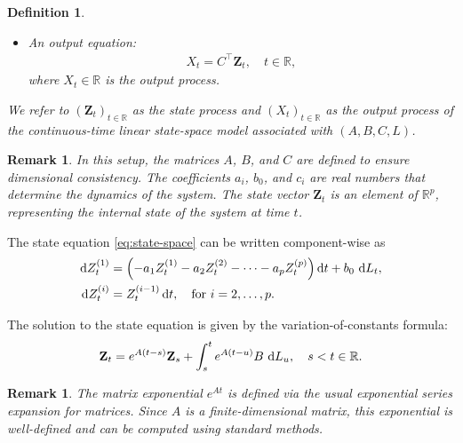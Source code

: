 \documentclass[10pt,a4paper,reqno]{amsart}
\newtheorem{definition}[theorem]{Definition}
\newtheorem{remark}[theorem]{Remark}
\theoremstyle{example}
\newcommand*\D{\mathop{}\!\textnormal{d}}
\begin{document}
\begin{definition}
\begin{itemize}
    \item An \emph{output equation}:
    \begin{align}\label{eq:output}
    X_t = C^\top \mathbf{Z}_t, \quad t \in \mathbb{R},
    \end{align}
    where $X_t \in \mathbb{R}$ is the output process.
\end{itemize}

We refer to $(\mathbf{Z}_t)_{t \in \mathbb{R}}$ as the \emph{state process} and $(X_t)_{t \in \mathbb{R}}$ as the \emph{output process} of the continuous-time linear state-space model associated with $(A, B, C, L)$.
\end{definition}

\begin{remark}
In this setup, the matrices $A$, $B$, and $C$ are defined to ensure dimensional consistency. The coefficients $a_i$, $b_0$, and $c_i$ are real numbers that determine the dynamics of the system. The state vector $\mathbf{Z}_t$ is an element of $\mathbb{R}^{p}$, representing the internal state of the system at time $t$.
\end{remark}

The state equation \eqref{eq:state-space} can be written component-wise as
\begin{align*}
\D Z_t^{(1)} &= \left( - a_1 Z_t^{(1)} - a_2 Z_t^{(2)} - \cdots - a_p Z_t^{(p)} \right) \D t + b_0 \, \D L_t, \\
\D Z_t^{(i)} &= Z_t^{(i-1)} \D t, \quad \text{for } i = 2, \dots, p.
\end{align*}

The solution to the state equation is given by the variation-of-constants formula:
\begin{align}\label{eq:state-solution}
\mathbf{Z}_t = e^{A (t - s)} \mathbf{Z}_s + \int_s^t e^{A (t - u)} B \, \D L_u, \quad s < t \in \mathbb{R}.
\end{align}

\begin{remark}
The matrix exponential $e^{A t}$ is defined via the usual exponential series expansion for matrices. Since $A$ is a finite-dimensional matrix, this exponential is well-defined and can be computed using standard methods.
\end{remark}
\end{document}
